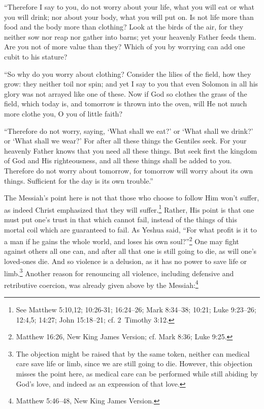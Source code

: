 \documentclass[letterpaper,12pt]{article}
\newenvironment{squotation}
  {\small\quotation}
  {\endquotation\normalsize}
\begin{document}
\begin{squotation}
``Therefore I say to you, do not worry about your life, what you will eat or what you will drink; nor about your body, what you will put on. Is not life more than food and the body more than clothing? Look at the birds of the air, for they neither sow nor reap nor gather into barns; yet your heavenly Father feeds them. Are you not of more value than they? Which of you by worrying can add one cubit to his stature?

``So why do you worry about clothing? Consider the lilies of the field, how they grow: they neither toil nor spin; and yet I say to you that even Solomon in all his glory was not arrayed like one of these. Now if God so clothes the grass of the field, which today is, and tomorrow is thrown into the oven, will He not much more clothe you, O you of little faith?

``Therefore do not worry, saying, `What shall we eat?' or `What shall we drink?' or `What shall we wear?' For after all these things the Gentiles seek. For your heavenly Father knows that you need all these things. But seek first the kingdom of God and His righteousness, and all these things shall be added to you. Therefore do not worry about tomorrow, for tomorrow will worry about its own things. Sufficient for the day is its own trouble.''
\end{squotation}

The Messiah's point here is not that those who choose to follow Him won't suffer, as indeed Christ emphasized that they will suffer.\footnote{See Matthew 5:10,12; 10:26-31; 16:24--26; Mark 8:34--38; 10:21; Luke 9:23--26; 12:4,5; 14:27; John 15:18--21; cf. 2~Timothy 3:12.} Rather, His point is that one must put one's trust in that which cannot fail, instead of the things of this mortal coil which are guaranteed to fail. As Yeshua said, ``For what profit is it to a man if he gains the whole world, and loses his own soul?''\footnote{Matthew 16:26, New King James Version; cf. Mark 8:36; Luke 9:25.} One may fight against others all one can, and after all that one is still going to die, as will one's loved-ones die. And so violence is a delusion, as it has no power to save life or limb.\footnote{The objection might be raised that by the same token, neither can medical care save life or limb, since we are still going to die. However, this objection misses the point here, as medical care can be performed while still abiding by God's love, and indeed as an expression of that love.} Another reason for renouncing all violence, including defensive and retributive coercion, was already given above by the Messiah:\footnote{Matthew 5:46--48, New King James Version.}
\end{document}
